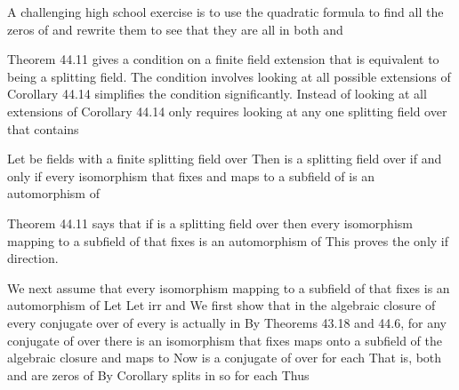 \documentclass[11pt,oneside]{article}
\begin{document}
\begin{BookBody}
A challenging high school exercise is to use the quadratic formula to find all the zeros of  and rewrite them to see that they are all in both  and \BookEnd{\blacktriangle}

Theorem 44.11 gives a condition on a finite field extension  that is equivalent to  being a splitting field. The condition involves looking at all possible extensions of  Corollary 44.14 simplifies the condition significantly. Instead of looking at all extensions of  Corollary 44.14 only requires looking at any one splitting field over  that contains 

 Let  be fields with  a finite splitting field over  Then  is a splitting field over  if and only if every isomorphism \BookInline{\sigma } that fixes  and maps  to a subfield of  is an automorphism of 

 Theorem 44.11 says that if  is a splitting field over  then every isomorphism \BookInline{\sigma } mapping  to a subfield of  that fixes  is an automorphism of  This proves the only if direction.

We next assume that every isomorphism \BookInline{\sigma } mapping  to a subfield of  that fixes  is an automorphism of  Let  Let  irr and   We first show that in the algebraic closure of  every conjugate 
over  of every  is actually in  By Theorems 43.18 and 44.6, for any conjugate  of  over  there is an isomorphism \BookInline{\sigma } that fixes  maps  onto a subfield of the algebraic closure  and maps  to  Now  is a conjugate of  over  for each  That is, both  and  are zeros of  By Corollary  splits in  so  for each  Thus

\end{BookBody}
\end{document}
